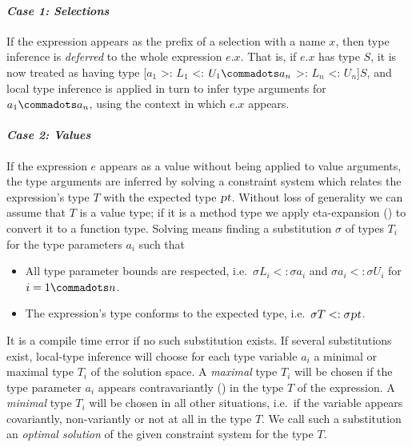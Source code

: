 \paragraph{\em Case 1: Selections}
If the expression appears as the prefix of a selection with a name
$x$, then type inference is {\em deferred} to the whole expression
$e.x$. That is, if $e.x$ has type $S$, it is now treated as having
type [$a_1$ >: $L_1$ <: $U_1 \commadots a_n$ >: $L_n$ <: $U_n$]$S$,
and local type inference is applied in turn to infer type arguments 
for $a_1 \commadots a_n$, using the context in which $e.x$ appears.

\paragraph{\em Case 2: Values}
If the expression $e$ appears as a value without being applied to
value arguments, the type arguments are inferred by solving a
constraint system which relates the expression's type $T$ with the
expected type $\mbox{\sl pt}$. Without loss of generality we can assume that
$T$ is a value type; if it is a method type we apply eta-expansion
() to convert it to a function type.  Solving
means finding a substitution $\sigma$ of types $T_i$ for the type
parameters $a_i$ such that
\begin{itemize}
\item 
All type parameter bounds are respected, i.e.\ 
$\sigma L_i <: \sigma a_i$ and $\sigma a_i <: \sigma U_i$ for $i = 1 \commadots n$.
\item 
The expression's type conforms to the expected type, i.e.\ 
$\sigma T <: \sigma \mbox{\sl pt}$.
\end{itemize}
It is a compile time error if no such substitution exists.  
If several substitutions exist, local-type inference will choose for
each type variable $a_i$ a minimal or maximal type $T_i$ of the
solution space.  A {\em maximal} type $T_i$ will be chosen if the type
parameter $a_i$ appears contravariantly (\sref{sec:variances}) in the
type $T$ of the expression.  A {\em minimal} type $T_i$ will be chosen
in all other situations, i.e.\ if the variable appears covariantly,
non-variantly or not at all in the type $T$. We call such a substitution
an {\em optimal solution} of the given constraint system for the type $T$.

